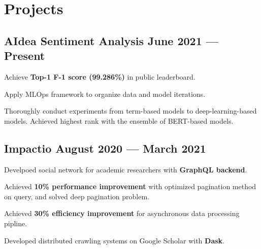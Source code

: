 \section{Projects}



\subsection*{AIdea Sentiment Analysis \hfill June 2021 --- Present} 
\begin{zitemize}
    \item Achieve \textbf{Top-1 F-1 score (99.286\%)} in public leaderboard.
    \item Apply MLOps framework to organize data and model iterations.
    \item Thoroughly conduct experiments from term-based models to deep-learning-based models. Achieved highest rank with the ensemble of BERT-based models.
\end{zitemize}


\subsection*{Impactio \hfill August 2020 --- March 2021} 
    \begin{zitemize}
        \item Develpoed social network for academic researchers with \textbf{GraphQL backend}.
        \item Achieved \textbf{10\% performance improvement} with optimized pagination method on query, and solved deep pagination problem.
        \item Achieved \textbf{30\% efficiency improvement} for asynchronous data processing pipline.
        \item Developed distributed crawling systems on Google Scholar with \textbf{Dask}.
    \end{zitemize}


